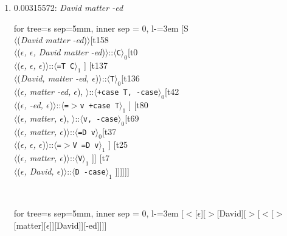 \documentclass[11pt]{article}
\begin{document}
\begin{enumerate}
	\item  0.00315572: \textit{David matter -ed} \\[0.5em]
	\begin{adjustbox}{max width = \textwidth}
	\begin{forest}
	for tree={s sep=5mm, inner sep = 0, l-=3em}
	[S\\$\langle$(\textit{David matter -ed})$\rangle$[t158\\$\langle$(\textit{$\epsilon${,} $\epsilon${,} David matter -ed})$\rangle$::$\langle$\texttt{C}$\rangle_0$[t0\\$\langle$(\textit{$\epsilon${,} $\epsilon${,} $\epsilon$})$\rangle$::$\langle$\texttt{{=}T C}$\rangle_1$ ] [t137\\$\langle$(\textit{David{,} matter -ed{,} $\epsilon$})$\rangle$::$\langle$\texttt{T}$\rangle_0$[t136\\$\langle$(\textit{$\epsilon${,} matter -ed{,} $\epsilon$}){,} $\rangle$::$\langle$\texttt{+case T{,} -case}$\rangle_0$[t42\\$\langle$(\textit{$\epsilon${,} -ed{,} $\epsilon$})$\rangle$::$\langle$\texttt{{=}$>$v +case T}$\rangle_1$ ] [t80\\$\langle$(\textit{$\epsilon${,} matter{,} $\epsilon$}){,} $\rangle$::$\langle$\texttt{v{,} -case}$\rangle_0$[t69\\$\langle$(\textit{$\epsilon${,} matter{,} $\epsilon$})$\rangle$::$\langle$\texttt{{=}D v}$\rangle_0$[t37\\$\langle$(\textit{$\epsilon${,} $\epsilon${,} $\epsilon$})$\rangle$::$\langle$\texttt{{=}$>$V {=}D v}$\rangle_1$ ] [t25\\$\langle$(\textit{$\epsilon${,} matter{,} $\epsilon$})$\rangle$::$\langle$\texttt{V}$\rangle_1$ ]] [t7\\$\langle$(\textit{$\epsilon${,} David{,} $\epsilon$})$\rangle$::$\langle$\texttt{D -case}$\rangle_1$ ]]]]]]
	\end{forest}
	\end{adjustbox}
	\\
	\begin{adjustbox}{max width = \textwidth}
	\begin{forest}
	for tree={s sep=5mm, inner sep = 0, l-=3em}
	[$<$[$\epsilon$][$>$[David][$>$[$<$[$>$[matter][$\epsilon$]][David]][-ed]]]]
	\end{forest}
	\end{adjustbox}
	\newpage


\end{enumerate}
\end{document}
